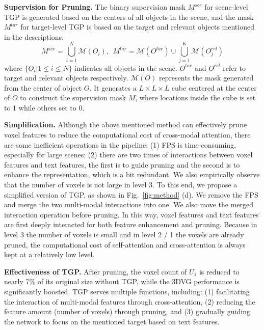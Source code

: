 \textbf{Supervision for Pruning.}
The binary supervision mask $M^{sce}$ for scene-level TGP is generated based on the centers of all objects in the scene, and the mask $M^{tar}$ for target-level TGP is based on the target and relevant objects mentioned in the descriptions:
\begin{equation}\label{eq4}
M^{sce} = \bigcup_{i=1}^{N} \mathcal{M}(O_i), \ \
M^{tar} = \mathcal{M}(O^{tar}) \cup \bigcup_{j=1}^{K} \mathcal{M}(O^{rel}_j)
\end{equation}
where $\{O_i|1\leq i\leq N\}$ indicates all objects in the scene. $O^{tar}$ and $O^{rel}$ refer to target and relevant objects respectively.
$\mathcal{M}(O)$ represents the mask generated from the center of object $O$. It generates a \( L \times L \times L \) cube centered at the center of $O$ to construct the supervision mask $M$, where locations inside the cube is set to 1 while others set to 0.


\textbf{Simplification.} Although the above mentioned method can effectively prune voxel features to reduce the computational cost of cross-modal attention, there are some inefficient operations in the pipeline: (1) FPS is time-consuming, especially for large scenes; (2) there are two times of interactions between voxel features and text features, the first is to guide pruning and the second is to enhance the representation, which is a bit redundant.
We also empirically observe that the number of voxels is not large in level 3. To this end, we propose a simplified version of TGP, as shown in Fig.~\ref{fig:method} (d). We remove the FPS and merge the two multi-modal interactions into one. We also move the merged interaction operation before pruning. In this way, voxel features and text features are first deeply interacted for both feature enhancement and pruning. Because in level 3 the number of voxels is small and in level 2 / 1 the voxels are already pruned, the computational cost of self-attention and cross-attention is always kept at a relatively low level. 

\textbf{Effectiveness of TGP.} After pruning, the voxel count of $U_1$ is reduced to nearly 7\% of its original size without TGP, while the 3DVG performance is significantly boosted.
TGP serves multiple functions, including: (1) facilitating the interaction of multi-modal features through cross-attention, (2) reducing the feature amount (number of voxels) through pruning, and (3) gradually guiding the network to focus on the mentioned target based on text features. 



